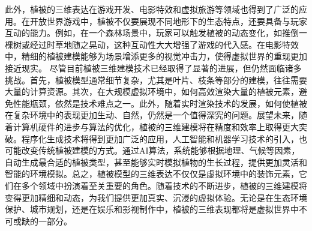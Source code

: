 {{此外，植被的三维表达在游戏开发、电影特效和虚拟旅游等领域也得到了广泛的应用。在开放世界游戏中，植被不仅要展现不同地形下的生态特点，还要具备与玩家互动的能力。例如，在一个森林场景中，玩家可以触发植被的动态变化，如推倒一棵树或经过时草地随之晃动，这种互动性大大增强了游戏的代入感。在电影特效中，精细的植被建模能够为场景增添更多的视觉冲击力，使得虚拟世界的重现更加接近现实。
尽管目前植被三维建模技术已经取得了显著的进展，但仍然面临诸多挑战。首先，植被模型通常细节复杂，尤其是叶片、枝条等部分的建模，往往需要大量的计算资源。其次，在大规模虚拟环境中，如何高效渲染大量的植被元素，避免性能瓶颈，依然是技术难点之一。此外，随着实时渲染技术的发展，如何使植被在复杂环境中的表现更加生动、自然，仍然是一个值得深究的问题。展望未来，随着计算机硬件的进步与算法的优化，植被的三维建模将在精度和效率上取得更大突破。程序化生成技术将得到更加广泛的应用，人工智能和机器学习技术的引入，也可能改变传统植被建模的方式。通过AI算法，系统能够根据地理、气候等因素，自动生成最合适的植被类型，甚至能够实时模拟植物的生长过程，提供更加灵活和智能的环境模拟。总之，植被模型的三维表达不仅仅是虚拟环境中的装饰元素，它们在多个领域中扮演着至关重要的角色。随着技术的不断进步，植被的三维建模将变得更加精细和动态，为我们提供更加真实、沉浸的虚拟体验。无论是在生态环境保护、城市规划，还是在娱乐和影视制作中，植被的三维表现都将是虚拟世界中不可或缺的一部分。
}}
